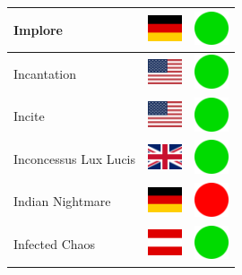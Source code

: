 \documentclass[12pt, a4paper, twoside]{report}
\begin{document}
\begin{center}
\begin{longtable}{|p{5cm}|p{2cm}|p{2cm}|}
 Implore                                                    & \includegraphics[width=1cm]{../4x3/de} &   \includegraphics[width=1cm]{../likes/y} \\ \hline
 Incantation                                                & \includegraphics[width=1cm]{../4x3/us} &   \includegraphics[width=1cm]{../likes/y} \\ \hline
 Incite                                                     & \includegraphics[width=1cm]{../4x3/us} &   \includegraphics[width=1cm]{../likes/y} \\ \hline
 Inconcessus Lux Lucis                                      & \includegraphics[width=1cm]{../4x3/gb} &   \includegraphics[width=1cm]{../likes/y} \\ \hline
 Indian Nightmare                                           & \includegraphics[width=1cm]{../4x3/de} &   \includegraphics[width=1cm]{../likes/n} \\ \hline
 Infected Chaos                                             & \includegraphics[width=1cm]{../4x3/at} &   \includegraphics[width=1cm]{../likes/y} \\ \hline

\end{longtable}
\end{center}
\end{document}
